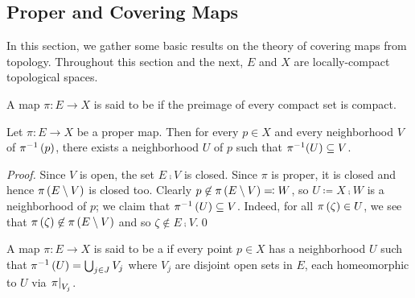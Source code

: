 \documentclass[../Moduli_Spaces_of_Riemann_Surfaces.tex]{subfiles}
\begin{document}
    \subsection{Proper and Covering Maps}
    In this section, we gather some basic results on the theory of covering maps from topology. Throughout this section and the next, $E$ and $X$ are locally-compact topological spaces.
    \begin{definition}
        A map $\pi:E\to X$ is said to be  if the preimage of every compact set is compact.
    \end{definition}
    \begin{proposition}\label{1.3:prp:proper_give_neighborhoods}
        Let $\pi:E\to X$ be a proper map. Then for every $p\in X$ and every neighborhood $V$ of $\pi^{-1}\left(p\right)$, there exists a neighborhood $U$ of $p$ such that $\pi^{-1}\!\left(U\right)\subseteq V$.
    \end{proposition}
    \begin{proof}
        Since $V$ is open, the set $E\comp V$ is closed. Since $\pi$ is proper, it is closed and hence $\pi\left(E\setminus V\right)$ is closed too. Clearly $p\not\in\pi\left(E\setminus V\right)\eqqcolon W$, so $U\coloneqq X\comp W$ is a neighborhood of $p$; we claim that $\pi^{-1}\left(U\right)\subseteq V$. Indeed, for all $\pi\left(\zeta\right)\in U$, we see that $\pi\left(\zeta\right)\not\in\pi\left(E\setminus V\right)$ and so $\zeta\not\in E\comp V$.\qed
    \end{proof}
    \begin{definition}
        A map $\pi:E\to X$ is said to be a  if every point $p\in X$ has a neighborhood $U$ such that $\pi^{-1}\left(U\right)=\bigcup_{j\in J}V_j$ where $V_j$ are disjoint open sets in $E$, each homeomorphic to $U$ via $\left.\pi\right|_{V_j}$.
    \end{definition}
\end{document}
